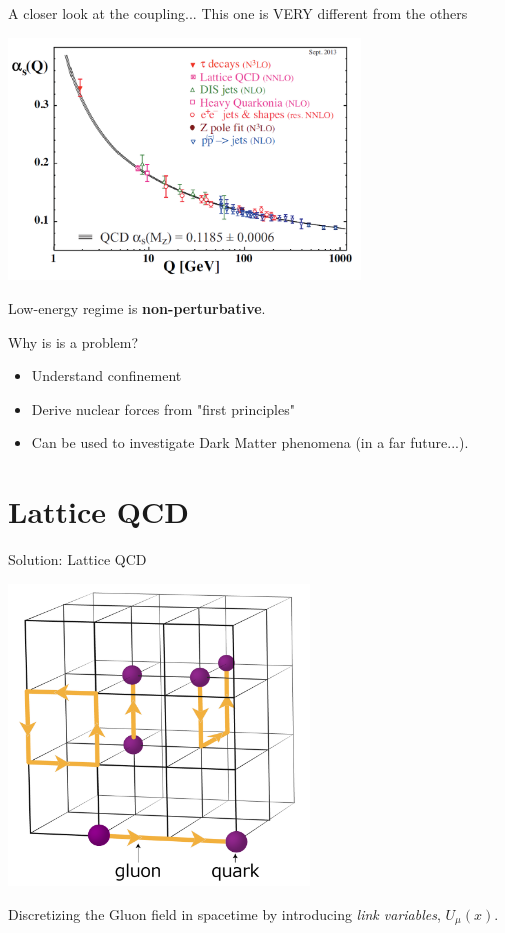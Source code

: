\documentclass[10pt]{beamer}
\begin{document}
\begin{frame}{A closer look at the coupling...}
	This one is VERY different from the others
	\begin{center}
	\includegraphics[width=0.7\textwidth]{figures/qcd_coupling.png}
	\end{center}
	Low-energy regime is \textbf{non-perturbative}.
\end{frame}

\begin{frame}{Why is is a problem?}
	\begin{itemize}
		\item Understand confinement
		\item Derive nuclear forces from "first principles"
		\item Can be used to investigate Dark Matter phenomena (in a far future...).
	\end{itemize}
\end{frame}

\section{Lattice QCD}

\begin{frame}{Solution: Lattice QCD}
	\begin{center}
		\includegraphics[width=0.6\textwidth]{figures/LatticeQCD.png}
	\end{center}

	Discretizing the Gluon field in spacetime by introducing \textit{link variables}, $U_\mu(x)$.
\end{frame}
\end{document}
